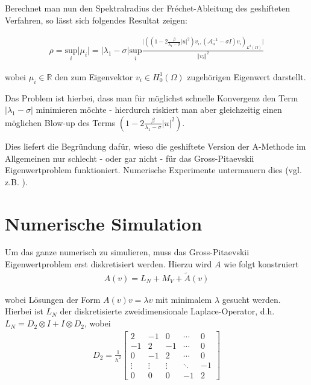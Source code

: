 \documentclass[final,bibliography=totocnumbered]{include/seminar}
\newcommand{\mR}{\ensuremath{\mathbb{R}}}
\newcommand{\Ltwo}{\ensuremath{{L^2(\Omega)}}}
\newcommand{\Honez}{\ensuremath{{H^1_0(\Omega)}}}
\newcommand{\mAi}{\ensuremath{\mathcal{A}}^{-1}}
\newcommand{\GP}{Gross-\allowbreak Pi\-taev\-skii}
\theoremstyle{break}
\begin{document}
Berechnet man nun den Spektralradius der Fréchet-Ableitung des geshifteten
Verfahren, so lässt sich folgendes Resultat zeigen:

\begin{align}
    \rho = \underset{i}{\mathrm{sup}} \vert \mu_i \vert
    = \vert \lambda_1 - \sigma \vert \underset{i}{\mathrm{sup}}
    \frac{\vert((1-2\frac{\beta}{\lambda_1 - \sigma}\vert u\vert^2)v_i,
    (\mAi_u - \sigma I)v_i)_\Ltwo \vert}
    {\Vert v_i \Vert^2}
\end{align}

wobei $\mu_i \in \mR$ den zum Eigenvektor $v_i \in \Honez$ zugehörigen Eigenwert darstellt.

Das Problem ist hierbei, dass man für möglichst schnelle Konvergenz den Term
$\vert \lambda_1 - \sigma \vert$ minimieren möchte - hierdurch riskiert man
aber gleichzeitig einen möglichen Blow-up des Terms $(1 - 2 \frac{\beta}{\lambda_1 - \sigma}\vert u \vert^2)$.

Dies liefert die Begründung dafür, wieso die geshiftete Version der A-Methode
im Allgemeinen nur schlecht - oder gar nicht - für das \GP{} Eigenwertproblem
funktioniert. Numerische Experimente untermauern dies (vgl. z.B. \cite{intro}).

\section{Numerische Simulation}

Um das ganze numerisch zu simulieren, muss das \GP{} Eigenwertproblem
erst diskretisiert werden. Hierzu wird $A$ wie folgt konstruiert
\begin{align}
    A(v) = L_N + M_V + \tilde{A}(v)
\end{align}

wobei Lösungen der Form $A(v)v = \lambda v$ mit minimalem $\lambda$ gesucht werden.
Hierbei ist $L_N$ der diskretisierte zweidimensionale Laplace-Operator, d.h.
$L_N = D_2 \otimes I + I \otimes D_2$, wobei
\begin{align}
    D_2 = \frac{1}{h^2}
    \begin{bmatrix}
        2 & -1 & 0 & \cdots & 0 \\
        -1 & 2 & -1 & \cdots & 0 \\
        0 & -1 & 2 & \cdots & 0 \\
        \vdots & \vdots & \vdots & \ddots & -1 \\
        0 & 0 & 0 & -1 & 2
    \end{bmatrix}
\end{align}
\end{document}
